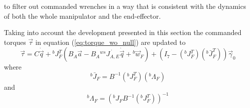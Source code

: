 to filter out commanded wrenches in a way that is consistent with the dynamics of both the
whole manipulator and the end-effector.
\par
Taking into account the development presented in this section the commanded torques $\vec{\tau}$
in equation (\ref{eq:torque_wo_null}) are updated to
\begin{equation}\label{eq:torqu_w_null_1}
  \vec{\tau} = C \dot{\vec{q}} + {}^{b}J^{T}_{F} ( B_A \vec{a} - B_A {}^{ws} \dot{J_{A,E}} \dot{\vec{q}} + {}^b\vec{w}_{F}) +
  (I_7 - ({}^{b}J^{T}_{F}) ({}^{b} \bar{J}^{T}_{F})) \vec{\gamma}_{0}
\end{equation}
where
\begin{equation*}
  {}^{b} \bar{J}_{F} = B^{-1} ({}^{b} J^{T}_{F}) ({}^{b} \Lambda_{F})
\end{equation*}
and
\begin{equation*}
  {}^{b} \Lambda_{F} = ({}^{b} J_{F} B^{-1} ({}^{b} J^{T}_{F}))^{-1}
\end{equation*}


